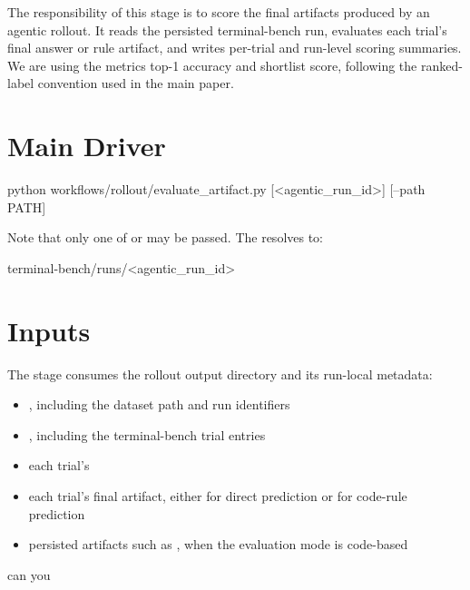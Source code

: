 \documentclass[11pt]{article}
\begin{document}
\label{docstart:final_artifact_scoring_stage}

The responsibility of this stage is to score the final artifacts produced by an agentic rollout.
It reads the persisted terminal-bench run, evaluates each trial's final answer or rule artifact, and writes per-trial and run-level scoring summaries.
We are using the metrics top-1 accuracy and shortlist score, following the ranked-label convention used in the main paper.

\section*{Main Driver}
\begin{DocCode}
python workflows/rollout/evaluate_artifact.py [<agentic_run_id>] [--path PATH]
\end{DocCode}
Note that only one of  or  may be passed.
The  resolves to:
\begin{DocCode}
terminal-bench/runs/<agentic_run_id>
\end{DocCode}

\section*{Inputs}
The stage consumes the rollout output directory and its run-local metadata:
\begin{itemize}
  \item {}, including the dataset path and run identifiers
  \item {}, including the terminal-bench trial entries
  \item each trial's 
  \item each trial's final artifact, either  for direct prediction or  for code-rule prediction
  \item persisted artifacts such as , when the evaluation mode is code-based
\end{itemize}
can you
\end{document}

